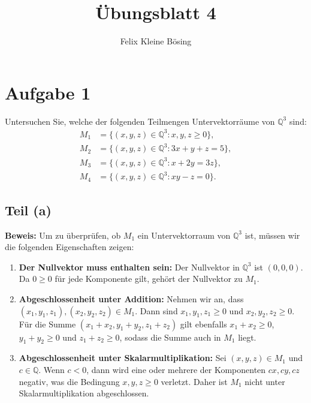 \documentclass[11pt]{article}
\begin{document}
\title{Übungsblatt 4}
\author{Felix Kleine Bösing}
\maketitle

\section*{Aufgabe 1}

Untersuchen Sie, welche der folgenden Teilmengen Untervektorräume von \( \mathbb{Q}^3 \) sind:
\[
\begin{aligned}
    M_1 &= \{(x, y, z) \in \mathbb{Q}^3 : x, y, z \geq 0\}, \\
    M_2 &= \{(x, y, z) \in \mathbb{Q}^3 : 3x + y + z = 5\}, \\
    M_3 &= \{(x, y, z) \in \mathbb{Q}^3 : x + 2y = 3z\}, \\
    M_4 &= \{(x, y, z) \in \mathbb{Q}^3 : xy - z =

    0\}.
\end{aligned}
\]

\subsection*{Teil (a)}

\textbf{Beweis:} Um zu überprüfen, ob \( M_1 \) ein Untervektorraum von \( \mathbb{Q}^3 \) ist, müssen wir die folgenden Eigenschaften zeigen:

\begin{enumerate}
    \item \textbf{Der Nullvektor muss enthalten sein:} Der Nullvektor in \( \mathbb{Q}^3 \) ist \((0, 0, 0)\). Da \(0 \geq 0\) für jede Komponente gilt, gehört der Nullvektor zu \( M_1 \).

    \item \textbf{Abgeschlossenheit unter Addition:} Nehmen wir an, dass \( (x_1, y_1, z_1), (x_2, y_2, z_2) \in M_1 \). Dann sind \( x_1, y_1, z_1 \geq 0 \) und \( x_2, y_2, z_2 \geq 0 \). Für die Summe \((x_1 + x_2, y_1 + y_2, z_1 + z_2)\) gilt ebenfalls \( x_1 + x_2 \geq 0 \), \( y_1 + y_2 \geq 0 \) und \( z_1 + z_2 \geq 0 \), sodass die Summe auch in \( M_1 \) liegt.

    \item \textbf{Abgeschlossenheit unter Skalarmultiplikation:} Sei \( (x, y, z) \in M_1 \) und \( c \in \mathbb{Q} \). Wenn \( c < 0 \), dann wird eine oder mehrere der Komponenten \( cx, cy, cz \) negativ, was die Bedingung \( x, y, z \geq 0 \) verletzt. Daher ist \( M_1 \) nicht unter Skalarmultiplikation abgeschlossen.
\end{enumerate}
\end{document}
